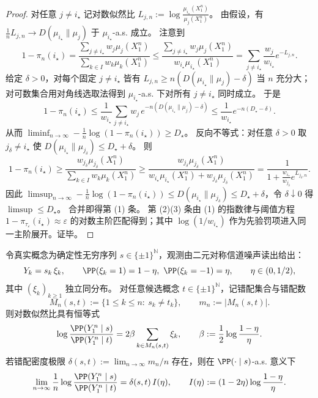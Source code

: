 \begin{proof}
对任意 \(j\neq i_\star\) 记对数似然比
\(
L_{j,n}:=\log\frac{\mu_{i_\star}(X_1^n)}{\mu_j(X_1^n)}
\)。
由假设，有 \(\frac1nL_{j,n}\to D(\mu_{i_\star}\|\mu_j)\) 于 \(\mu_{i_\star}\)-a.s. 成立。
注意到
\[
1-\pi_n(i_\star)
=\frac{\sum_{j\neq i_\star}w_j\mu_j(X_1^n)}{\sum_{k\in I}w_k\mu_k(X_1^n)}
\le
\frac{\sum_{j\neq i_\star}w_j\mu_j(X_1^n)}{w_{i_\star}\mu_{i_\star}(X_1^n)}
=\sum_{j\neq i_\star}\frac{w_j}{w_{i_\star}}e^{-L_{j,n}}.
\]
给定 \(\delta>0\)，对每个固定 \(j\neq i_\star\) 皆有 \(L_{j,n}\ge n(D(\mu_{i_\star}\|\mu_j)-\delta)\) 当 \(n\) 充分大；对可数集合用对角线选取法得到 \(\mu_{i_\star}\)-a.s. 下对所有 \(j\neq i_\star\) 同时成立。
于是
\[
1-\pi_n(i_\star)
\le
\frac1{w_{i_\star}}\sum_{j\neq i_\star}w_j\,e^{-n(D(\mu_{i_\star}\|\mu_j)-\delta)}
\le
\frac1{w_{i_\star}}e^{-n(D_\star-\delta)}.
\]
从而 \(\liminf_{n\to\infty}-\frac1n\log(1-\pi_n(i_\star))\ge D_\star\)。
反向不等式：对任意 \(\delta>0\) 取 \(j_\delta\neq i_\star\) 使 \(D(\mu_{i_\star}\|\mu_{j_\delta})\le D_\star+\delta\)。
则
\[
1-\pi_n(i_\star)
\ge
\frac{w_{j_\delta}\mu_{j_\delta}(X_1^n)}{\sum_{k\in I}w_k\mu_k(X_1^n)}
\ge
\frac{w_{j_\delta}\mu_{j_\delta}(X_1^n)}{w_{i_\star}\mu_{i_\star}(X_1^n)+w_{j_\delta}\mu_{j_\delta}(X_1^n)}
=\frac{1}{1+\frac{w_{i_\star}}{w_{j_\delta}}e^{L_{j_\delta,n}}}.
\]
因此 \(\limsup_{n\to\infty}-\frac1n\log(1-\pi_n(i_\star))\le D(\mu_{i_\star}\|\mu_{j_\delta})\le D_\star+\delta\)，令 \(\delta\downarrow 0\) 得 \(\limsup\le D_\star\)。
合并即得第 (1) 条。
第 (2)(3) 条由 (1) 的指数律与阈值方程 \(1-\pi_{\tau_\varepsilon}(i_\star)\approx \varepsilon\) 的对数主阶匹配得到；其中 \(\log(1/w_{i_\star})\) 作为先验罚项进入同一主阶展开。证毕。
\end{proof}

\begin{proposition}[噪声读出下的错配信息率与可计算指数律]\label{prop:xi-bsc-mismatch-information-rate}
令真实概念为确定性无穷序列 \(s\in\{\pm1\}^{\mathbb N}\)，观测由二元对称信道噪声读出给出：
\[
Y_k=s_k\,\xi_k,
\qquad
\PP(\xi_k=1)=1-\eta,\ \PP(\xi_k=-1)=\eta,
\qquad
\eta\in(0,1/2),
\]
其中 \((\xi_k)_{k\ge 1}\) 独立同分布。
对任意候选概念 \(t\in\{\pm1\}^{\mathbb N}\)，记错配集合与错配数
\[
M_n(s,t):=\{1\le k\le n:\ s_k\neq t_k\},
\qquad
m_n:=|M_n(s,t)|.
\]
则对数似然比具有恒等式
\[
\log\frac{\PP(Y_1^n\mid s)}{\PP(Y_1^n\mid t)}
=2\beta\sum_{k\in M_n(s,t)}\xi_k,
\qquad
\beta:=\frac12\log\frac{1-\eta}{\eta}.
\]
若错配密度极限 \(\delta(s,t):=\lim_{n\to\infty}m_n/n\) 存在，则在 \(\PP(\cdot\mid s)\)-a.s. 意义下
\[
\lim_{n\to\infty}\frac1n\log\frac{\PP(Y_1^n\mid s)}{\PP(Y_1^n\mid t)}
=\delta(s,t)\,I(\eta),
\qquad
I(\eta):=(1-2\eta)\log\frac{1-\eta}{\eta}.
\]
\end{proposition}


